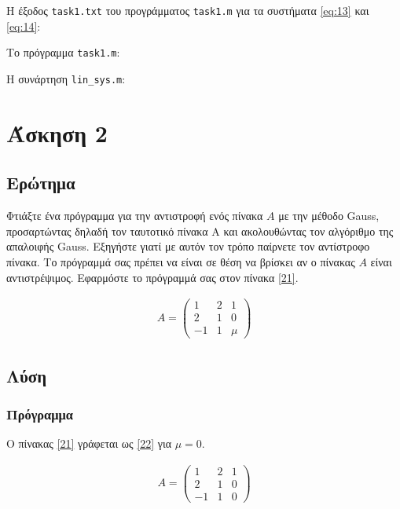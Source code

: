 \documentclass[12pt, fleqn, leqno]{extreport}
\begin{document}
Η έξοδος \lstinline[language={}]{task1.txt} του προγράμματος \lstinline[language={}]{task1.m} για τα συστήματα \eqref{eq:13} και \eqref{eq:14}:


\newpage
Το πρόγραμμα \lstinline[language={}]{task1.m}:


\newpage
Η συνάρτηση \lstinline[language={}]{lin_sys.m}:


\chapter{Άσκηση 2}
\section{Ερώτημα}

Φτιάξτε ένα πρόγραμμα για την αντιστροφή ενός πίνακα $A$ με την μέθοδο Gauss, προσαρτώντας δηλαδή τον ταυτοτικό πίνακα Α και ακολουθώντας τον αλγόριθμο της απαλοιφής Gauss. Εξηγήστε γιατί με αυτόν τον τρόπο παίρνετε τον αντίστροφο πίνακα. Το πρόγραμμά σας πρέπει να είναι σε θέση να βρίσκει αν ο πίνακας $A$ είναι αντιστρέψιμος. Εφαρμόστε το πρόγραμμά σας στον πίνακα \eqref{21}.

\begin{equation}
    \begin{aligned}
        A = \begin{pmatrix}
            1  & 2 & 1   \\
            2  & 1 & 0   \\
            -1 & 1 & \mu
        \end{pmatrix}\label{21}
    \end{aligned}
\end{equation}


\newpage
\section{Λύση}
\subsection{Πρόγραμμα}

Ο πίνακας \eqref{21} γράφεται ως \eqref{22} για $\mu = 0$.

\begin{equation}
    \begin{aligned}
        A = \begin{pmatrix}
            1  & 2 & 1 \\
            2  & 1 & 0 \\
            -1 & 1 & 0
        \end{pmatrix}\label{22}
    \end{aligned}
\end{equation}
\end{document}
